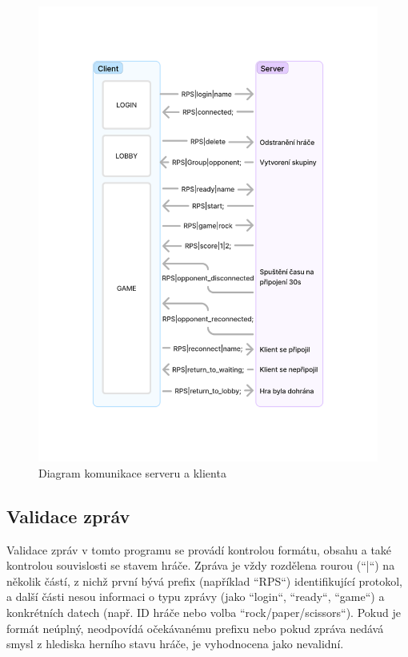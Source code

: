 \documentclass[12pt, a4paper]{article}
\begin{document}
\begin{figure}[h!]
    \centering
    \includegraphics[width=\textwidth]{img/diagram.pdf} %
    \caption{Diagram komunikace serveru a klienta}
    \label{fig:diagram}
\end{figure}

\newpage
\subsection{Validace zpráv}
Validace zpráv v tomto programu se provádí kontrolou formátu, obsahu a také kontrolou souvislosti se stavem hráče. Zpráva je vždy rozdělena rourou (``|``) na několik částí, z nichž první bývá prefix (například ``RPS``) identifikující protokol, a další části nesou informaci o typu zprávy (jako ``login``, ``ready``, ``game``) a konkrétních datech (např. ID hráče nebo volba ``rock/paper/scissors``). Pokud je formát neúplný, neodpovídá očekávanému prefixu nebo pokud zpráva nedává smysl z hlediska herního stavu hráče, je vyhodnocena jako nevalidní.
\end{document}
